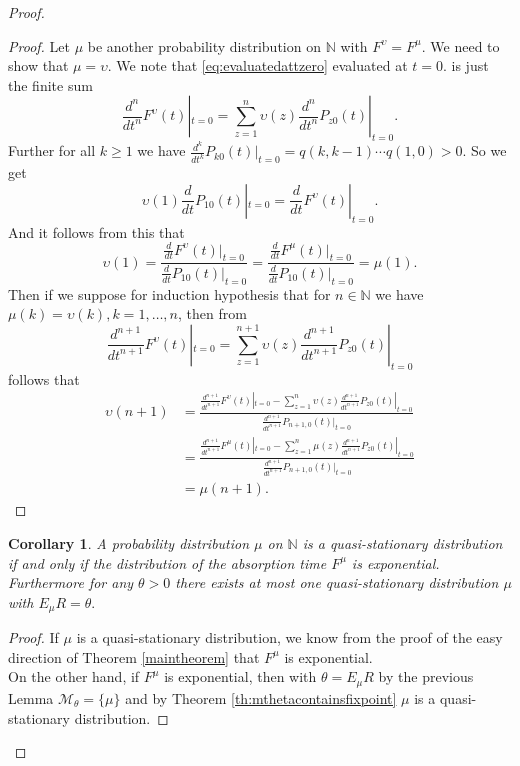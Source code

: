\documentclass[12pt,a4paper]{scrartcl}
\newtheorem{corollary}[theorem]{Corollary}
\numberwithin{equation}{section}
\newcommand{\N}{\mathbb{N}} %
\begin{document}
\begin{proof}
\begin{proof}
Let $\mu$ be another probability distribution on $\N$ with $F^{\upsilon} = F^{\mu}$. We need to show that $\mu = \upsilon.$ We note that \eqref{eq:evaluatedattzero} evaluated at $t=0.$ is just the finite sum
\begin{equation}
\frac{d^n}{dt^n}F^{\upsilon}\left(t\right)|_{t=0} = \sum_{z=1}^{n} \upsilon\left(z\right) \frac{d^n}{dt^n} P_{z0}\left(t\right)|_{t=0}.
\end{equation}
Further for all $k \geq 1$ we have $\frac{d^k}{dt^k}P_{k0}\left(t\right)|_{t=0} = q\left(k,k-1\right) \cdots q\left(1,0\right) > 0.$ So we get
$$\upsilon\left(1\right) \frac{d}{dt}P_{10}\left(t\right)|_{t=0} = \frac{d}{dt}F^{\upsilon}\left(t\right)|_{t=0}. $$
And it follows from this that
$$\upsilon\left(1\right) = \frac{\frac{d}{dt}F^{\upsilon}\left(t\right)|_{t=0}}{\frac{d}{dt}P_{10}\left(t\right)|_{t=0}} = \frac{\frac{d}{dt}F^{\mu}\left(t\right)|_{t=0}}{\frac{d}{dt}P_{10}\left(t\right)|_{t=0}} = \mu\left(1\right). $$
Then if we suppose for induction hypothesis that for $n \in \N$ we have $\mu\left(k\right) = \upsilon\left(k\right), k=1,\ldots, n$, then from
$$\frac{d^{n+1}}{dt^{n+1}}F^{\upsilon}\left(t\right)|_{t=0} = \sum_{z=1}^{n+1} \upsilon\left(z\right) \frac{d^{n+1}}{dt^{n+1}} P_{z0}\left(t\right)|_{t=0} $$
follows that
\begin{align*}
\upsilon\left(n+1\right) &= \frac{\frac{d^{n+1}}{dt^{n+1}}F^{\upsilon}\left(t\right)|_{t=0} - \sum_{z=1}^{n} \upsilon\left(z\right) \frac{d^{n+1}}{dt^{n+1}} P_{z0}\left(t\right)|_{t=0} }{\frac{d^{n+1}}{dt^{n+1}}P_{n+1,0}\left(t\right)|_{t=0} } \\
&= \frac{\frac{d^{n+1}}{dt^{n+1}}F^{\mu}\left(t\right)|_{t=0} - \sum_{z=1}^{n} \mu\left(z\right) \frac{d^{n+1}}{dt^{n+1}} P_{z0}\left(t\right)|_{t=0} }{\frac{d^{n+1}}{dt^{n+1}}P_{n+1,0}\left(t\right)|_{t=0} } \\
&= \mu\left(n+1\right).
\end{align*}


\end{proof}

\begin{corollary}
A probability distribution $\mu$ on $\N$ is a quasi-stationary distribution if and only if the distribution of the absorption time $F^{\mu}$ is exponential. Furthermore for any $\theta > 0$ there exists at most one quasi-stationary distribution $\mu$ with $E_{\mu} R = \theta. $
\end{corollary}
\begin{proof}
If $\mu$ is a quasi-stationary distribution, we know from the proof of the easy direction of Theorem \ref{maintheorem} that $F^{\mu}$ is exponential.\\
On the other hand, if $F^{\mu}$ is exponential, then with $\theta = E_{\mu} R$ by the previous Lemma $\mathcal{M}_{\theta} = \lbrace \mu \rbrace$ and by Theorem \ref{th:mthetacontainsfixpoint} $\mu$ is a quasi-stationary distribution. 
\end{proof}


\end{proof}
\end{document}
